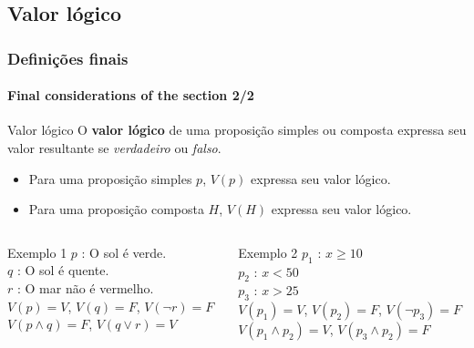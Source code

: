 \documentclass[10pt, headsepline, captions=tableabove,xcolor=table]{beamer}
\begin{document}
\subsection{Valor lógico}
%
\begin{frame}[t]
    \frametitle{Definições finais}
    \framesubtitle{Final considerations of the section 2/2}
    \small
    \begin{block}{Valor lógico}
        O \textbf{valor lógico} de uma proposição simples ou composta expressa seu valor resultante se \textit{verdadeiro} ou \textit{falso}.
        \begin{itemize}
            \item Para uma proposição simples $p$, $V(p)$ expressa seu valor lógico.
            \item Para uma proposição composta $H$, $V(H)$ expressa seu valor lógico.
        \end{itemize}
    \end{block}
    \begin{columns}[T]
        \begin{column}{.5\textwidth}
            \begin{exampleblock}{Exemplo 1}
                \quad $p$ : O sol é verde. \\
                \quad $q$ : O sol é quente. \\
                \quad $r$ : O mar não é vermelho.\\[4pt]
                \quad $V(p) = V$, $V(q) = F$, $V(\lnot r)=F$ \\
                \quad $V(p \land q) = F$, \quad $V(q \lor r) = V$
            \end{exampleblock}
        \end{column}
        \begin{column}{.5\textwidth}
            \begin{exampleblock}{Exemplo 2}
                \quad $p_1$ : $x \geq 10$   \\
                \quad $p_2$ : $x < 50$\\
                \quad $p_3$ : $x > 25$ \\[4pt]
                $V(p_1) = V$, $V(p_2) = F$, $V(\lnot p_3)=F$ \\
                \quad $V(p_1 \land p_2) = V$, $V(p_3 \land p_2) = F$
            \end{exampleblock}
        \end{column}
    \end{columns}
\end{frame}
%
\end{document}
